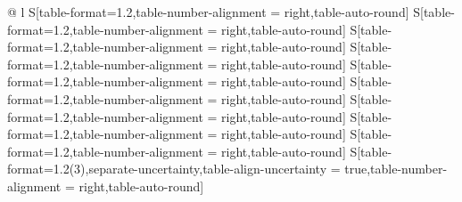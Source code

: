 \begin{table*}[tb]
 \centering
 \caption{%
  Full extents at
  half maximum of
  the \aclp{PSF}
  \eqref{eqn:cs_math_tpsf} associated with
  the observation processes
  \eqref{eqn:recovery_sys_lin_eq_v_rx_born_all_f_all_in_mat} induced by
  all incident waves.
  They were evaluated for
  nine uniformly distributed positions along
  the diagonal from
  $\trans{ ( \SI{-17.5}{\milli\meter}, \SI{2}{\milli\meter} ) }$ to
  $\trans{ ( \SI{17.5}{\milli\meter}, \SI{37}{\milli\meter} ) }$ and numbered from
  \numrange{1}{9} with
  increasing axial coordinate.
 }
 \label{tab:sim_study_obj_A_sr_1_tpsf_fehm}
 \begin{tabular}{%
  @{}%
  l%
  S[table-format=1.2,table-number-alignment = right,table-auto-round]%
  S[table-format=1.2,table-number-alignment = right,table-auto-round]%
  S[table-format=1.2,table-number-alignment = right,table-auto-round]%
  S[table-format=1.2,table-number-alignment = right,table-auto-round]%
  S[table-format=1.2,table-number-alignment = right,table-auto-round]%
  S[table-format=1.2,table-number-alignment = right,table-auto-round]%
  S[table-format=1.2,table-number-alignment = right,table-auto-round]%
  S[table-format=1.2,table-number-alignment = right,table-auto-round]%
  S[table-format=1.2,table-number-alignment = right,table-auto-round]%
  S[table-format=1.2(3),separate-uncertainty,table-align-uncertainty = true,table-number-alignment = right,table-auto-round]%
}
\end{tabular}
\end{table*}
